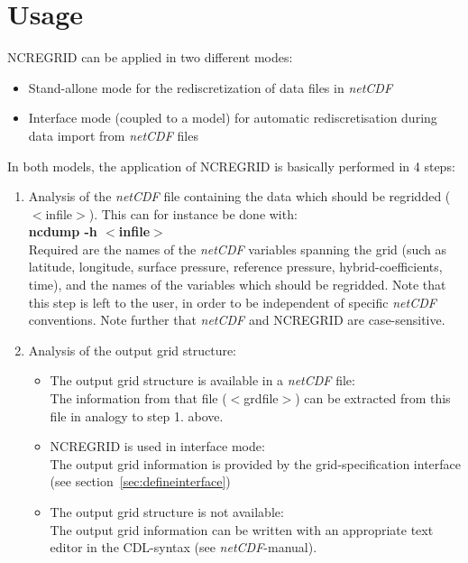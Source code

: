 \documentclass[12pt, a4paper]{article}
\begin{document}
\section{Usage}
\label{sec:usage}
NCREGRID can be applied in two different modes:
\begin{itemize}
 \item Stand-allone mode for the rediscretization of data files in
       {\it netCDF}
 \item Interface mode (coupled to a model)
       for automatic rediscretisation during data import from {\it netCDF}
       files
\end{itemize}
%
In both models, the application of NCREGRID is basically performed
in 4 steps:
%
\begin{enumerate}
\item Analysis of the {\it netCDF} file containing the data which should be
      regridded ($<$infile$>$). This can for instance be done with:\\
      {\bf ncdump -h $<$infile$>$}\\       
      Required are the names of the {\it netCDF} variables spanning the
      grid (such as latitude, longitude, surface pressure, reference pressure,
      hybrid-co\-efficients, time), and the names of the variables which
      should be regridded.
      Note that this step is left to the user, in order to be independent
      of specific {\it netCDF} conventions.
      Note further that {\it netCDF} and NCREGRID are case-sensitive.
\item Analysis of the output grid structure:\\
      \begin{itemize}
      \item The output grid structure is available in a {\it netCDF} file:\\
            The information from that file ($<$grdfile$>$) can be extracted
            from this file in analogy to step 1. above.
      \item NCREGRID is used in interface mode:\\
            The output grid information is provided
            by the grid-specification
            interface (see section~\ref{sec:defineinterface})
      \item The output grid structure is not available:\\
            The output grid information can be written with an appropriate
            text editor in the CDL-syntax (see {\it netCDF}-manual).

\end{itemize}
\end{enumerate}
\end{document}
